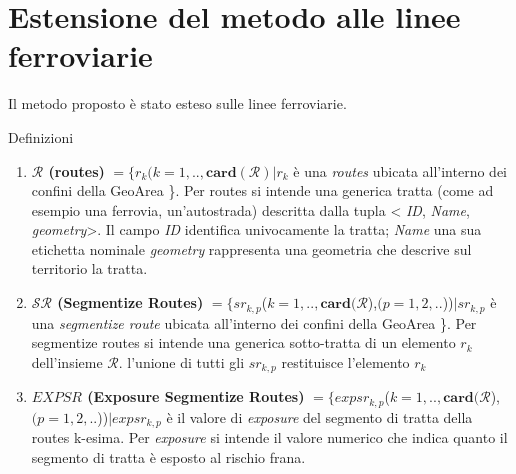 
\chapter{Estensione del metodo alle linee ferroviarie} %
Il metodo proposto è stato esteso sulle linee ferroviarie.

Definizioni
\begin{enumerate}
	\item \textbf{$ \mathcal{R} $ (routes)} $ = \{r_k(k=1,..,\mathbf{card}(\mathcal{R}) | r_k $ è una \textit{routes} ubicata all'interno dei confini della  GeoArea \}. Per routes si intende una generica tratta (come ad esempio una ferrovia, un'autostrada) descritta dalla tupla < \textit{ID}, \textit{Name}, \textit{geometry}>. Il campo \textit{ID} identifica univocamente la tratta; \textit{Name} una sua etichetta nominale \textit{geometry} rappresenta una geometria che descrive sul territorio la tratta.
	
	
	\item \textbf{$ \mathcal{SR} $ (Segmentize Routes)} $ = \{sr_{k,p}$($k=1,..,\mathbf{card}(\mathcal{R}$),$(p = 1, 2, .. $))$  | sr_{k,p} $ è una \textit{segmentize route} ubicata all'interno dei confini della  GeoArea \}. Per segmentize routes si intende una generica sotto-tratta di un elemento $r_k$ dell'insieme $\mathcal{R}$. l'unione di tutti gli $sr_{k,p}$ restituisce l'elemento $r_k$ 
	
	\item \textbf{$EXPSR$ (Exposure Segmentize Routes)} $ = \{expsr_{k,p}$($k=1,..,\mathbf{card}(\mathcal{R}$),$(p = 1, 2, .. $))$ | expsr_{k,p} $ è il valore di \textit{exposure} del segmento di tratta della routes k-esima. Per \textit{exposure} si intende il valore numerico che indica quanto il segmento di tratta è esposto al rischio frana.
\end{enumerate}